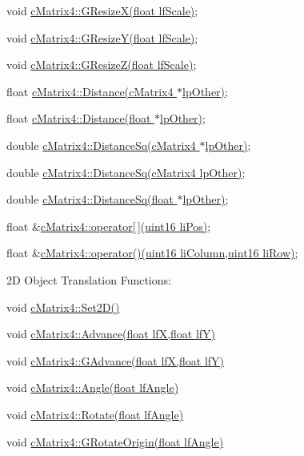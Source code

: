  void \hyperlink{classc_matrix4_ac2be3e4653b0c8324c6a505e54544043}{cMatrix4::GResizeX(float lfScale)}; \par
 void \hyperlink{classc_matrix4_a13fda6e0dc1b19f7f136c1963bbdac77}{cMatrix4::GResizeY(float lfScale)}; \par
 void \hyperlink{classc_matrix4_a74217e4c12e8f5623a572535ba443bc4}{cMatrix4::GResizeZ(float lfScale)}; \par
 \par
 float \hyperlink{classc_matrix4_acd04bb06d1d12807b203b0aaf9e9b608}{cMatrix4::Distance(cMatrix4 $\ast$lpOther)}; \par
 float \hyperlink{classc_matrix4_a83fd4655f67a81cb42f3c50262ec593e}{cMatrix4::Distance(float $\ast$lpOther)}; \par
 double \hyperlink{classc_matrix4_afb4a1edc36d2de9330e48bd182fe2a9b}{cMatrix4::DistanceSq(cMatrix4 $\ast$lpOther)}; \par
 double \hyperlink{classc_matrix4_ad225d8db157a99b593f774e08c266722}{cMatrix4::DistanceSq(cMatrix4 lpOther)}; \par
 double \hyperlink{classc_matrix4_ac524fac9525c6ff780e95c648b229e41}{cMatrix4::DistanceSq(float $\ast$lpOther)}; \par
 \par
 float \&\hyperlink{classc_matrix4_a4b91a4d790f5a0decc76d41e54b80049}{cMatrix4::operator\mbox{[}$\,$\mbox{]}(uint16 liPos)}; \par
 float \&\hyperlink{classc_matrix4_a1e17bf69091f804aec716524dbdec375}{cMatrix4::operator()(uint16 liColumn,uint16 liRow)}; \par
 2D Object Translation Functions: \par
 void \hyperlink{classc_matrix4_ad24236403317622459c3309938be9d21}{cMatrix4::Set2D()} \par
 \par
 void \hyperlink{classc_matrix4_ab956ec27a465b889126632475fd7d703}{cMatrix4::Advance(float lfX,float lfY)} \par
 void \hyperlink{classc_matrix4_a2dc12cbe708c7bc63ca2beff47c0c835}{cMatrix4::GAdvance(float lfX,float lfY)} \par
 \par
 void \hyperlink{classc_matrix4_ac86eb165802e359a11ace5db20b73c72}{cMatrix4::Angle(float lfAngle)} \par
 void \hyperlink{classc_matrix4_ab21d0553250b8ca4b0388105afc79478}{cMatrix4::Rotate(float lfAngle)} \par
 void \hyperlink{classc_matrix4_a04a196147274eb6b3d1aca1782c26091}{cMatrix4::GRotateOrigin(float lfAngle)} \par

